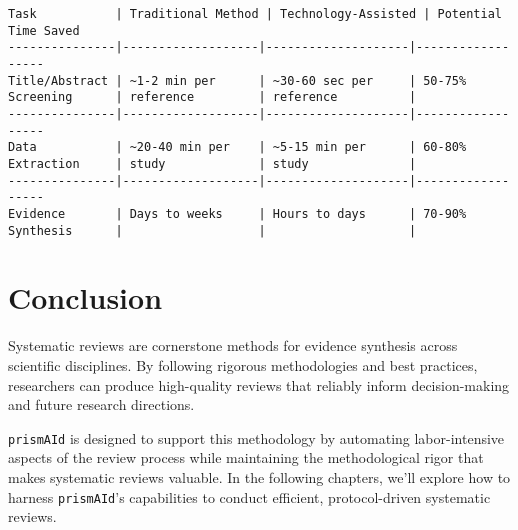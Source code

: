 \begin{configbox}
\begin{lstlisting}
Task           | Traditional Method | Technology-Assisted | Potential Time Saved
---------------|-------------------|--------------------|------------------
Title/Abstract | ~1-2 min per      | ~30-60 sec per     | 50-75%
Screening      | reference         | reference          |
---------------|-------------------|--------------------|------------------
Data           | ~20-40 min per    | ~5-15 min per      | 60-80%
Extraction     | study             | study              |
---------------|-------------------|--------------------|------------------
Evidence       | Days to weeks     | Hours to days      | 70-90%
Synthesis      |                   |                    |
\end{lstlisting}
\end{configbox}


\section{Conclusion}

Systematic reviews are cornerstone methods for evidence synthesis across scientific disciplines. By following rigorous methodologies and best practices, researchers can produce high-quality reviews that reliably inform decision-making and future research directions.


\texttt{prismAId} is designed to support this methodology by automating labor-intensive aspects of the review process while maintaining the methodological rigor that makes systematic reviews valuable. In the following chapters, we'll explore how to harness \texttt{prismAId}'s capabilities to conduct efficient, protocol-driven systematic reviews.




